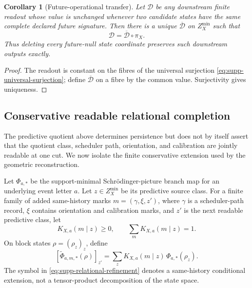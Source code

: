 \documentclass[11pt]{article}
\newtheorem{corollary}[corollary]{Corollary}
\theoremstyle{definition}
\theoremstyle{remark}
\begin{document}
\begin{corollary}[Future-operational transfer]
\label{cor:supp-future-operational-transfer}
Let $\mathcal D$ be any downstream finite readout whose value is unchanged
whenever two candidate states have the same complete declared future
signature.  Then there is a unique $\overline{\mathcal D}$ on
$Z_X^{\min}$ such that
\begin{equation}
 \boxed{\mathcal D=\overline{\mathcal D}\circ\pi_X.}
 \label{eq:supp-compiler-factorization}
\end{equation}
Thus deleting every future-null state coordinate preserves such downstream
outputs exactly.
\end{corollary}

\begin{proof}
The readout is constant on the fibres of the universal surjection
\eqref{eq:supp-universal-surjection}; define $\overline{\mathcal D}$ on a
fibre by the common value.  Surjectivity gives uniqueness.
\end{proof}

\subsection{Conservative readable relational completion}
\label{supp:readable-relational-completion}

The predictive quotient above determines persistence but does not by itself
assert that the quotient class, scheduler path, orientation, and calibration
are jointly readable at one cut.  We now isolate the finite conservative
extension used by the geometric reconstruction.

Let $\Phi_{a,*}$ be the support-minimal Schr\"odinger-picture branch map for an
underlying event letter $a$.  Let $z\in Z_X^{\min}$ be its predictive source
class.  For a finite family of added same-history marks $m=(\gamma,\xi,z')$,
where $\gamma$ is a scheduler-path record, $\xi$ contains orientation and
calibration marks, and $z'$ is the next readable predictive class, let
\begin{equation}
 K_{X,a}(m\mid z)\ge0,
 \qquad
 \sum_m K_{X,a}(m\mid z)=1.
 \label{eq:supp-relational-kernel}
\end{equation}
On block states $\rho=(\rho_z)_z$, define
\begin{equation}
 \boxed{
 [\widetilde\Phi_{a,m,*}(\rho)]_{z'}
 =\sum_z K_{X,a}(m\mid z)\,\Phi_{a,*}(\rho_z).}
 \label{eq:supp-relational-refinement}
\end{equation}
The symbol in \eqref{eq:supp-relational-refinement} denotes a same-history
conditional extension, not a tensor-product decomposition of the state space.
\end{document}
